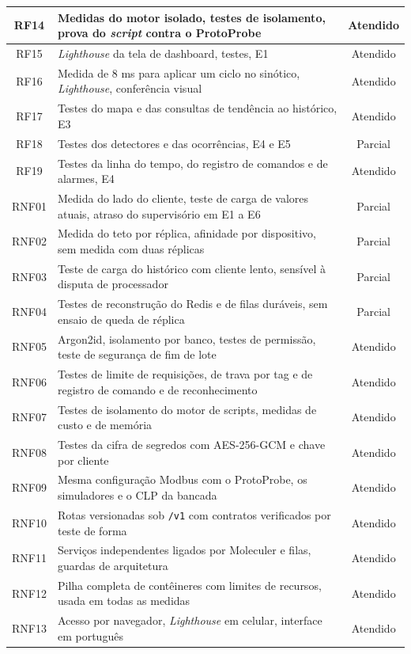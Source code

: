 {\begin{xltabular}{\textwidth}{cXc}
        \hline
        RF14 & Medidas do motor isolado, testes de isolamento, prova do \emph{script} contra o ProtoProbe & Atendido \\
        \hline
        RF15 & \emph{Lighthouse} da tela de dashboard, testes, E1 & Atendido \\
        \hline
        RF16 & Medida de 8 ms para aplicar um ciclo no sinótico, \emph{Lighthouse}, conferência visual & Atendido \\
        \hline
        RF17 & Testes do mapa e das consultas de tendência ao histórico, E3 & Atendido \\
        \hline
        RF18 & Testes dos detectores e das ocorrências, E4 e E5 & Parcial \\
        \hline
        RF19 & Testes da linha do tempo, do registro de comandos e de alarmes, E4 & Atendido \\
        \hline
        RNF01 & Medida do lado do cliente, teste de carga de valores atuais, atraso do supervisório em E1 a E6 & Parcial \\
        \hline
        RNF02 & Medida do teto por réplica, afinidade por dispositivo, sem medida com duas réplicas & Parcial \\
        \hline
        RNF03 & Teste de carga do histórico com cliente lento, sensível à disputa de processador & Parcial \\
        \hline
        RNF04 & Testes de reconstrução do Redis e de filas duráveis, sem ensaio de queda de réplica & Parcial \\
        \hline
        RNF05 & Argon2id, isolamento por banco, testes de permissão, teste de segurança de fim de lote & Atendido \\
        \hline
        RNF06 & Testes de limite de requisições, de trava por tag e de registro de comando e de reconhecimento & Atendido \\
        \hline
        RNF07 & Testes de isolamento do motor de scripts, medidas de custo e de memória & Atendido \\
        \hline
        RNF08 & Testes da cifra de segredos com AES-256-GCM e chave por cliente & Atendido \\
        \hline
        RNF09 & Mesma configuração Modbus com o ProtoProbe, os simuladores e o CLP da bancada & Atendido \\
        \hline
        RNF10 & Rotas versionadas sob \texttt{/v1} com contratos  verificados por teste de forma & Atendido \\
        \hline
        RNF11 & Serviços independentes ligados por Moleculer e filas, guardas de arquitetura & Atendido \\
        \hline
        RNF12 & Pilha completa de contêineres com limites de recursos, usada em todas as medidas & Atendido \\
        \hline
        RNF13 & Acesso por navegador, \emph{Lighthouse} em celular, interface em português & Atendido \\
        \hline
\end{xltabular}}

